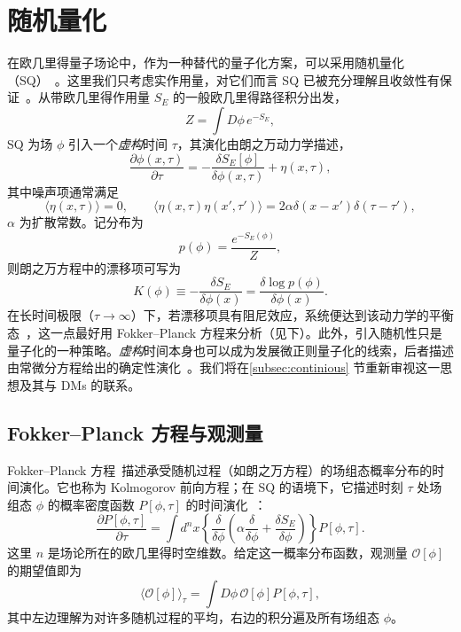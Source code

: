 \section{随机量化}
\label{sec:sq}

在欧几里得量子场论中，作为一种替代的量子化方案，可以采用随机量化（SQ）~\cite{Parisi:1980ys}。这里我们只考虑实作用量，对它们而言 SQ 已被充分理解且收敛性有保证~\cite{Damgaard:1987rr}。从带欧几里得作用量 $S_E$ 的一般欧几里得路径积分出发，
\begin{equation}
    Z = \int D\phi \, e^{-S_E},
\end{equation}
SQ 为场 $\phi$ 引入一个\textit{虚构}时间 $\tau$，其演化由朗之万动力学描述，
\begin{equation}
    \frac{\partial \phi(x,\tau)}{\partial \tau} = - \frac{\delta S_E[\phi]}{\delta \phi(x,\tau)} + \eta(x,\tau),
    \label{eq:sq}
\end{equation}
其中噪声项通常满足
\begin{equation}
    \langle \eta(x,\tau) \rangle = 0,\qquad \langle \eta(x,\tau)\eta(x',\tau') \rangle = 2\alpha\delta(x-x')\delta(\tau - \tau'),
\end{equation}
$\alpha$ 为扩散常数。记分布为
\begin{equation}
    p(\phi) = \frac{e^{-S_E(\phi)}}{Z},
\end{equation}
则朗之万方程中的漂移项可写为
\begin{equation}
\label{eq:K}
    K(\phi)  \equiv  - \frac{\delta S_E}{\delta \phi(x)} = \frac{\delta \log p(\phi)}{\delta \phi(x)}.
\end{equation}
在长时间极限（$\tau\rightarrow \infty$）下，若漂移项具有阻尼效应，系统便达到该动力学的平衡态~\cite{Namiki:1993fd}，这一点最好用 Fokker--Planck 方程来分析（见下）。此外，引入随机性只是量子化的一种策略。\textit{虚构}时间本身也可以成为发展微正则量子化的线索，后者描述由常微分方程给出的确定性演化~\cite{Callaway:1982eb}。我们将在\ref{subsec:continious} 节重新审视这一思想及其与 DMs 的联系。

\subsection{Fokker--Planck 方程与观测量}

Fokker--Planck 方程~\cite{risken1996fokker}描述承受随机过程（如朗之万方程）的场组态概率分布的时间演化。它也称为 Kolmogorov 前向方程；在 SQ 的语境下，它描述时刻 $\tau$ 处场组态 $\phi$ 的概率密度函数 $P[\phi,\tau]$ 的时间演化~\cite{Damgaard:1987rr,Namiki:1992wf}：
\begin{equation}
 \frac{\partial P[\phi, \tau]}{\partial \tau} = \int d^nx \left\{
 \frac{\delta}{\delta \phi}
 \left(\alpha\frac{\delta }{\delta \phi} + \frac{\delta S_E}{\delta \phi} \right)
 \right\} P[\phi, \tau].
 \label{eq:f-p}
\end{equation}
这里 $n$ 是场论所在的欧几里得时空维数。给定这一概率分布函数，观测量 $\mathcal{O}[\phi]$ 的期望值即为~\cite{Damgaard:1987rr}
\begin{equation}
\langle \mathcal{O}[\phi] \rangle_\tau = \int D\phi\,\mathcal{O}[\phi] P[\phi, \tau],
\end{equation}
其中左边理解为对许多随机过程的平均，右边的积分遍及所有场组态 $\phi$。

